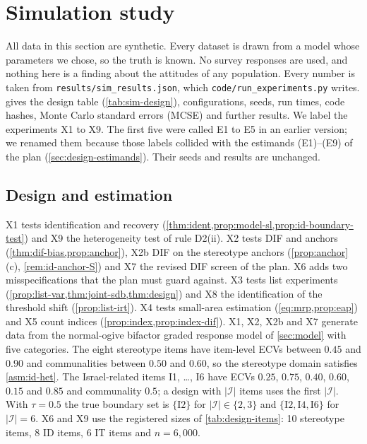 \section{Simulation study}\label{sec:simulation}

\providecommand{\armT}{\mathsf{T}}
\providecommand{\armC}{\mathsf{C}}
\providecommand{\armD}{\mathsf{D}}
\providecommand{\SDB}{\mathrm{SDB}}

All data in this section are synthetic. Every dataset is drawn from a model whose parameters we chose, so the truth is known. No survey responses are used, and nothing here is a finding about the attitudes of any population. Every number is taken from \texttt{results/sim\_results.json}, which \texttt{code/run\_experiments.py} writes.  gives the design table (\cref{tab:sim-design}), configurations, seeds, run times, code hashes, Monte Carlo standard errors (MCSE) and further results. We label the experiments X1 to X9. The first five were called E1 to E5 in an earlier version; we renamed them because those labels collided with the estimands (E1)--(E9) of the plan (\cref{sec:design-estimands}). Their seeds and results are unchanged.

\subsection{Design and estimation}\label{sec:sim-design}

X1 tests identification and recovery (\cref{thm:ident,prop:model-sl,prop:id-boundary-test}) and X9 the heterogeneity test of rule D2(ii). X2 tests DIF and anchors (\cref{thm:dif-bias,prop:anchor}), X2b DIF on the stereotype anchors (\cref{prop:anchor}(c), \cref{rem:id-anchor-S}) and X7 the revised DIF screen of the plan. X6 adds two misspecifications that the plan must guard against. X3 tests list experiments (\cref{prop:list-var,thm:joint-sdb,thm:design}) and X8 the identification of the threshold shift (\cref{prop:list-irt}). X4 tests small-area estimation (\cref{eq:mrp,prop:eap}) and X5 count indices (\cref{prop:index,prop:index-dif}). X1, X2, X2b and X7 generate data from the normal-ogive bifactor graded response model of \cref{sec:model} with five categories. The eight stereotype items have item-level ECVs between $0.45$ and $0.90$ and communalities between $0.50$ and $0.60$, so the stereotype domain satisfies \cref{asm:id-het}. The Israel-related items I1, \dots, I6 have ECVs $0.25$, $0.75$, $0.40$, $0.60$, $0.15$ and $0.85$ and communality $0.5$; a design with $|\mathcal I|$ items uses the first $|\mathcal I|$. With $\tau=0.5$ the true boundary set is $\{\mathrm{I}2\}$ for $|\mathcal I|\in\{2,3\}$ and $\{\mathrm{I}2,\mathrm{I}4,\mathrm{I}6\}$ for $|\mathcal I|=6$. X6 and X9 use the registered sizes of \cref{tab:design-items}: 10 stereotype items, 8 ID items, 6 IT items and $n=6{,}000$.

